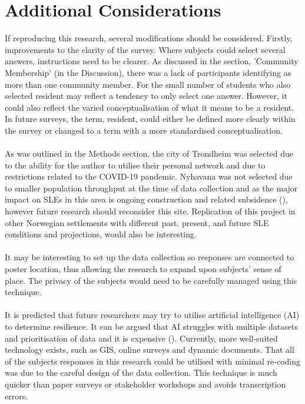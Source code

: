 \section{Additional Considerations}
If reproducing this research, several modifications should be considered. Firstly, improvements to the clarity of the survey. Where subjects could select several answers, instructions need to be clearer. As discussed in the section, 'Community Membership' (in the Discussion), there was a lack of participants identifying as more than one community member. For the small number of students who also selected resident may reflect a tendency to only select one answer. However, it could also reflect the varied conceptualisation of what it means to be a resident. In future surveys, the term, resident, could either be defined more clearly within the survey or changed to a term with a more standardised conceptualisation.  
\paragraph{}
As was outlined in the Methods section, the city of Trondheim was selected due to the ability for the author to utilise their personal network and due to restrictions related to the COVID-19 pandemic.  Nyhavana was not selected due to smaller population throughput at the time of data collection and as the major impact on SLEs in this area is ongoing construction and related subsidence (\cite{miljoenheten_og_byplankontoret_trondheim_kommune_9-notat-om-havnivastigning-og-stormflo---hensyn-i-arealplanlegging-nyhavnapdf_2020}), however future research should reconsider this site. Replication of this project in other Norwegian settlements with different past, present, and future SLE conditions and projections, would also be interesting. 

\paragraph{}
It may be interesting to set up the data collection so responses are connected to poster location, thus allowing the research to expand upon subjects' sense of place. The privacy of the subjects would need to be carefully managed using this technique. 
\paragraph{}
It is predicted that future researchers may try to utilise artificial intelligence (AI) to determine resilience. It can be argued that AI struggles with multiple datasets and prioritisation of data and it is expensive (\cite{shane_you_2019}). Currently, more well-suited technology exists, such as GIS, online surveys and dynamic documents. That all of the subjects responses in this research could be utilised with minimal re-coding was due to the careful design of the data collection. This technique is much quicker than paper surveys or stakeholder workshops and avoids transcription errors.
